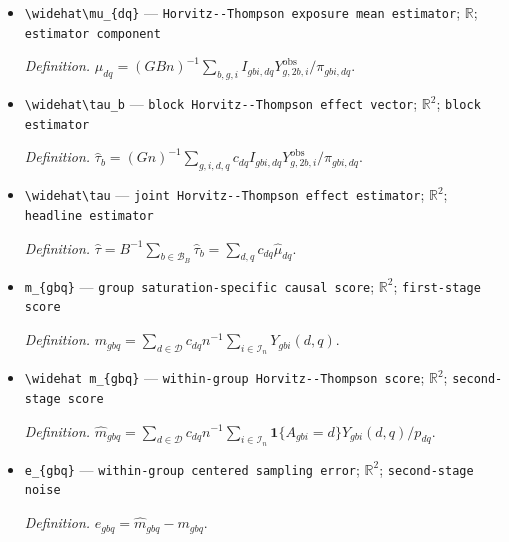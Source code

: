 \documentclass{article}
\begin{document}
\begin{itemize}
  \par\smallskip\noindent\emph{Definition.} \(\tau=(\tau_D,\tau_S)^\top=B^{-1}\sum_{b\in\mathcal B_B}\tau_b=\sum_{d,q}c_{dq}\mu_{dq}\).
  \item \texttt{\textbackslash{}\allowbreak{}widehat\textbackslash{}\allowbreak{}mu\_\allowbreak{}\{dq\}\allowbreak{}} --- \texttt{Horvitz-\allowbreak{}-\allowbreak{}Thompson exposure mean estimator}; \(\mathbb R\); \texttt{estimator component}
  \par\smallskip\noindent\emph{Definition.} \(\widehat\mu_{dq}=(GBn)^{-1}\sum_{b,g,i}I_{gbi,dq}Y^{\mathrm{obs}}_{g,2b,i}/\pi_{gbi,dq}\).
  \item \texttt{\textbackslash{}\allowbreak{}widehat\textbackslash{}\allowbreak{}tau\_\allowbreak{}b} --- \texttt{block Horvitz-\allowbreak{}-\allowbreak{}Thompson effect vector}; \(\mathbb R^2\); \texttt{block estimator}
  \par\smallskip\noindent\emph{Definition.} \(\widehat\tau_b=(Gn)^{-1}\sum_{g,i,d,q}c_{dq}I_{gbi,dq}Y^{\mathrm{obs}}_{g,2b,i}/\pi_{gbi,dq}\).
  \item \texttt{\textbackslash{}\allowbreak{}widehat\textbackslash{}\allowbreak{}tau} --- \texttt{joint Horvitz-\allowbreak{}-\allowbreak{}Thompson effect estimator}; \(\mathbb R^2\); \texttt{headline estimator}
  \par\smallskip\noindent\emph{Definition.} \(\widehat\tau=B^{-1}\sum_{b\in\mathcal B_B}\widehat\tau_b=\sum_{d,q}c_{dq}\widehat\mu_{dq}\).
  \item \texttt{m\_\allowbreak{}\{gbq\}\allowbreak{}} --- \texttt{group saturation-\allowbreak{}specific causal score}; \(\mathbb R^2\); \texttt{first-\allowbreak{}stage score}
  \par\smallskip\noindent\emph{Definition.} \(m_{gbq}=\sum_{d\in\mathcal D}c_{dq}n^{-1}\sum_{i\in\mathcal I_n}Y_{gbi}(d,q)\).
  \item \texttt{\textbackslash{}\allowbreak{}widehat m\_\allowbreak{}\{gbq\}\allowbreak{}} --- \texttt{within-\allowbreak{}group Horvitz-\allowbreak{}-\allowbreak{}Thompson score}; \(\mathbb R^2\); \texttt{second-\allowbreak{}stage score}
  \par\smallskip\noindent\emph{Definition.} \(\widehat m_{gbq}=\sum_{d\in\mathcal D}c_{dq}n^{-1}\sum_{i\in\mathcal I_n}\mathbf 1\{A_{gbi}=d\}Y_{gbi}(d,q)/p_{dq}\).
  \item \texttt{e\_\allowbreak{}\{gbq\}\allowbreak{}} --- \texttt{within-\allowbreak{}group centered sampling error}; \(\mathbb R^2\); \texttt{second-\allowbreak{}stage noise}
  \par\smallskip\noindent\emph{Definition.} \(e_{gbq}=\widehat m_{gbq}-m_{gbq}\).

\end{itemize}
\end{document}
